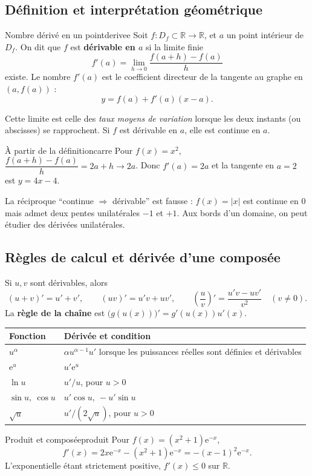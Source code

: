 \documentclass[11pt,a4paper,oneside]{article}
\newcommand{\R}{\mathbb R}
\newcommand{\e}{\mathrm e}
\begin{document}
\subsection{Définition et interprétation géométrique}
\begin{definition}{Nombre dérivé en un point}{derivee}
Soit $f:D_f\subset\R\to\R$, et $a$ un point intérieur de $D_f$. On dit que $f$ est \textbf{dérivable en $a$} si la limite finie
\[f'(a)=\lim_{h\to0}\frac{f(a+h)-f(a)}{h}\]
existe. Le nombre $f'(a)$ est le coefficient directeur de la tangente au graphe en $(a,f(a))$ :
\[y=f(a)+f'(a)(x-a).\]
\end{definition}
Cette limite est celle des \emph{taux moyens de variation} lorsque les deux instants (ou abscisses) se rapprochent. Si $f$ est dérivable en $a$, elle est continue en $a$.
\begin{exemple}{À partir de la définition}{carre}
Pour $f(x)=x^2$, $\dfrac{f(a+h)-f(a)}{h}=2a+h\to2a$. Donc $f'(a)=2a$ et la tangente en $a=2$ est $y=4x-4$.
\end{exemple}
\begin{attentionbox}
La réciproque ``continue $\Rightarrow$ dérivable'' est fausse : $f(x)=|x|$ est continue en $0$ mais admet deux pentes unilatérales $-1$ et $+1$. Aux bords d'un domaine, on peut étudier des dérivées unilatérales.
\end{attentionbox}

\subsection{Règles de calcul et dérivée d'une composée}
Si $u,v$ sont dérivables, alors
\[
(u+v)'=u'+v',\qquad (uv)'=u'v+uv',\qquad
\left(\frac uv\right)'=\frac{u'v-uv'}{v^2}\quad(v\neq0).
\]
La \textbf{règle de la chaîne} est $\bigl(g(u(x))\bigr)'=g'(u(x))u'(x)$.
\begin{center}\begin{tabularx}{\textwidth}{@{}lX@{}}\toprule
\textbf{Fonction} & \textbf{Dérivée et condition}\\\midrule
$u^\alpha$ & $\alpha u^{\alpha-1}u'$ lorsque les puissances réelles sont définies et dérivables\\
$\e^u$ & $u'\e^u$\\
$\ln u$ & $u'/u$, pour $u>0$\\
$\sin u,\ \cos u$ & $u'\cos u,\ -u'\sin u$\\
$\sqrt{u}$ & $u'/(2\sqrt{u})$, pour $u>0$\\\bottomrule\end{tabularx}\end{center}
\begin{exemple}{Produit et composée}{produit}
Pour $f(x)=(x^2+1)\e^{-x}$,
\[f'(x)=2x\e^{-x}-(x^2+1)\e^{-x}=-(x-1)^2\e^{-x}.\]
L'exponentielle étant strictement positive, $f'(x)\le0$ sur $\R$.
\end{exemple}
\end{document}
